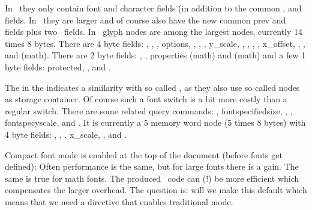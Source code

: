 \startitemize
    \startitem
        In \TEX\ they only contain font and character fields (in addition to the
        common ,  and  fields.
    \stopitem
    \startitem
        In \LUATEX\ they are larger and of course also have the new common \typ
        {prev} and  fields plus two \SYNCTEX\ fields.
    \stopitem
    \startitem
        In \LUAMETATEX\ glyph nodes are among the largest nodes, currently 14
        times 8 bytes.
    \stopitem
    \startitem
        There are 4 byte fields: , , , \typ
        {options}, , , , \typ
        {y_scale}, , , , , \typ
        {x_offset}, , ,  and 
        (math).
    \stopitem
    \startitem
        There are 2 byte fields: , , \typ
        {properties} (math) and  (math) and a few 1 byte fields: \typ
        {protected}, ,  and .
    \stopitem
\stopitemize


\stoptitle

\starttitle[title=Intermezzo: font spec nodes]

\startitemize
    \startitem
        The  in the \typ {\fontspecdef} indicates a similarity with
        so called , as they also use so called nodes as storage
        container.
    \stopitem
    \startitem
        Of course such a font switch is a bit more costly than a regular \typ
        {\font} switch.
    \stopitem
    \startitem
        There are some related query commands: , \typ
        {fontspecifiedsize}, , , \typ
        {fontspecyscale},  and .
    \stopitem
    \startitem
        It is currently a 5 memory word node (5 times 8 bytes) with 4 byte
        fields: , , , \type
        {x_scale}, ,  and .
    \stopitem
\stopitemize

\stoptitle

\starttitle[title=Compact mode]

\startitemize
    \startitem
        Compact font mode is enabled at the top of the document (before fonts get
        defined):
\starttyping
{}
\stoptyping
    \stopitem
    \startitem
        Often performance is the same, but for large fonts there is a gain. The
        same is true for math fonts.
    \stopitem
    \startitem
        The produced \PDF\ code can (!) be more efficient which compensates the
        larger overhead.
    \stopitem
    \startitem
        The question is: will we make this default which means that we need a
        directive that enables traditional mode.
    \stopitem
\stopitemize

